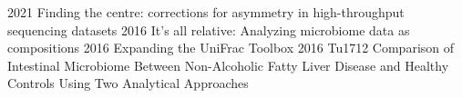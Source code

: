 \documentclass[]{twentysecondcv}
\begin{document}
\begin{twentyshort}
  \twentyitemshort
    {2021}
    {Finding the centre: corrections for asymmetry in high-throughput sequencing datasets}
  \twentyitemshort
    {2016}
    {It's all relative: Analyzing microbiome data as compositions}
  \twentyitemshort
    {2016}
    {Expanding the UniFrac Toolbox}
  \twentyitemshort
    {2016}
    {Tu1712 Comparison of Intestinal Microbiome Between Non-Alcoholic Fatty Liver Disease and Healthy Controls Using Two Analytical Approaches}
\end{twentyshort}

\end{document}
